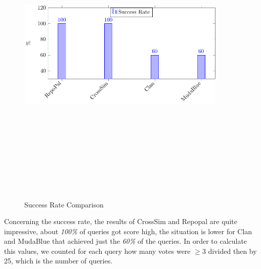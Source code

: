 \begin{figure}[!h]
\includegraphics[width=10cm,height=15cm,keepaspectratio]{images/SuccessRate.pdf}
\centering
\caption{Success Rate Comparison}
\label{fig:SuccessC}
\end{figure}

Concerning the success rate, the results of CrossSim and Repopal are quite impressive, about \emph{100\%} of queries got score high, the situation is lower for Clan and MudaBlue that achieved just the \emph{60\%} of the queries. In order to calculate this values, we counted for each query how many votes were \emph{$\geq3$} divided then by 25, which is the number of queries.


